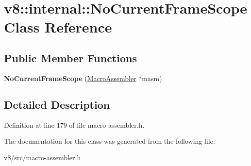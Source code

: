 \hypertarget{classv8_1_1internal_1_1NoCurrentFrameScope}{}\section{v8\+:\+:internal\+:\+:No\+Current\+Frame\+Scope Class Reference}
\label{classv8_1_1internal_1_1NoCurrentFrameScope}
\subsection*{Public Member Functions}
\begin{DoxyCompactItemize}
\item 
\mbox{\label{classv8_1_1internal_1_1NoCurrentFrameScope_ab7307b6340dc7e49193c60a82aef3a5e}} 
{\bfseries No\+Current\+Frame\+Scope} (\mbox{\hyperlink{classv8_1_1internal_1_1MacroAssembler}{Macro\+Assembler}} $\ast$masm)
\end{DoxyCompactItemize}


\subsection{Detailed Description}


Definition at line 179 of file macro-\/assembler.\+h.



The documentation for this class was generated from the following file\+:\begin{DoxyCompactItemize}
\item 
v8/src/macro-\/assembler.\+h\end{DoxyCompactItemize}
